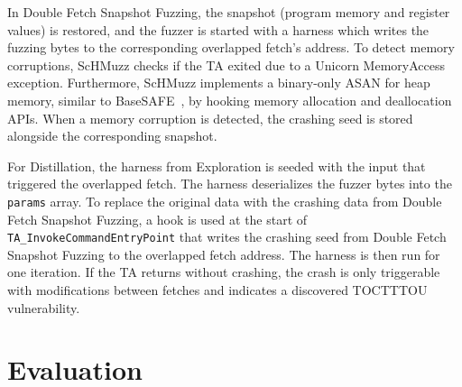 \documentclass[letterpaper,twocolumn,10pt]{article}
\newcommand{\sysname}{ScHMuzz\xspace}
\newcommand{\taemu}{TÄMU\xspace}
\newcommand{\stageone}{Exploration\xspace}
\newcommand{\stagetwo}{Double Fetch Snapshot Fuzzing\xspace}
\newcommand{\stagethree}{Distillation\xspace}
\begin{document}
In \stagetwo, the snapshot (program memory and register values) is restored, and the fuzzer is started with a harness which 
writes the fuzzing bytes to the corresponding overlapped fetch's address. To detect memory corruptions, \sysname checks if 
the TA exited due to a Unicorn MemoryAccess exception. Furthermore, \sysname implements a binary-only ASAN for heap memory, 
similar to BaseSAFE~\cite{basesafe}, by hooking memory allocation and deallocation APIs. When a memory corruption is detected, 
the crashing seed is stored alongside the corresponding snapshot. 

For \stagethree, the harness from \stageone is seeded with the input that triggered the overlapped fetch. The harness deserializes 
the fuzzer bytes into the \texttt{params} array. 
To replace the original data with the 
crashing data from \stagetwo, a hook is used at the start of \texttt{TA\_InvokeCommandEntryPoint} that writes the crashing seed 
from \stagetwo to the overlapped fetch address. 
The harness is then run for one iteration. If the TA returns without crashing, the crash is only triggerable with modifications between fetches and indicates a discovered TOCTTTOU vulnerability.

% 

\section{Evaluation}\label{sec:evaluation}
\end{document}
